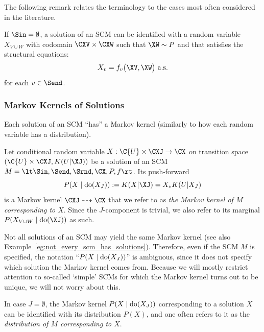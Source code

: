 The following remark relates the terminology to the cases most often considered in the literature.
\begin{Rem}\label{rem:scm_no_inputs_solutions}
  If $\Sin = \emptyset$, a solution of an SCM can be identified with a random variable 
  $X_{V \cup W}$ with codomain $\CXV \times \CXW$ such that $\XW \sim P$ and that
  satisfies the structural equations:
  \begin{equation}\label{eq:scm_structural_equations_componentwise}
    X_v = f_v\big(\XV, \XW\big) \text{ a.s.}
  \end{equation}
  for each $v \in \Send$.
\end{Rem}

\subsubsection{Markov Kernels of Solutions}

Each solution of an SCM ``has'' a Markov kernel (similarly to how each random variable has a distribution).
\begin{Not}\label{def:scm_kernels}
  Let conditional random variable $X : \C{U} \times \CXJ \to \CX$ on transition space $(\C{U} \times \CXJ, K(U|\XJ))$ be a solution of an SCM
  $M = \lt \Sin, \Send, \Srnd, \CX, P, f \rt$.
  Its push-forward 
  $$P(X \mid \doit(X_J)) := K(X|\XJ) = X_* K(U|X_J)$$
  is a Markov kernel $\CXJ \dshto \CX$ that we refer to as \emph{the Markov kernel of $M$ corresponding to $X$}.
  Since the $J$-component is trivial, we also refer to its marginal $P(X_{V\cup W}\mid \doit(\XJ))$ as such.
\end{Not}

Not all solutions of an SCM may yield the same Markov kernel (see also Example~\ref{eg:not_every_scm_has_solutions}).
Therefore, even if the SCM $M$ is specified, the notation ``$P(X \mid \operatorname{do}(X_J))$'' is ambiguous, since it does not specify which solution the Markov kernel comes from. 
Because we will mostly restrict attention to so-called `simple' SCMs for which the Markov kernel turns out to be unique, we will not worry about this.

\begin{Rem}
In case $J = \emptyset$, the Markov kernel $P(X \mid \operatorname{do}(X_J))$ corresponding to a solution $X$ can be identified with its distribution $P(X)$, and one often refers to it as the \emph{distribution of $M$ corresponding to $X$}.
\end{Rem}

